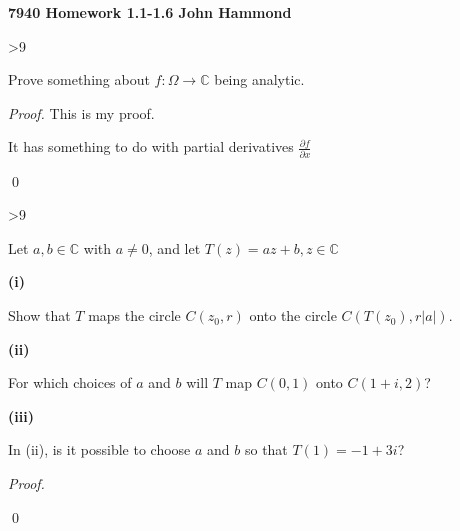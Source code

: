 \documentclass{article}
\def\C{{\mathbb{C}}}
\newcommand{\pd}[2]{\frac{\partial #1}{\partial #2}}
\newenvironment{problem}[1]%
  {\vspace{\baselineskip}%
   \ifnum #1>9 \else \hspace{.78ex} \fi {\large \bf#1.$\;$}%
   \begin{lrbox}{\probinput}%
   \begin{minipage}[t]{.9175\textwidth}}%
  {\end{minipage}%
   \end{lrbox}%
   \usebox{\probinput}}
\newenvironment{subprob}[1]%
  {\vspace{.5\baselineskip}%
   {\bf #1)$\;$}%
   \begin{lrbox}{\subinput}%
   \begin{minipage}[t]{.965\textwidth}}%
  {\end{minipage}%
   \end{lrbox}%
   \usebox{\subinput}}
\begin{document}
{\large \bf 7940 Homework 1.1-1.6 \hfill John Hammond}
\vspace{\baselineskip}

\begin{problem}{1} 
Prove something about $f : \Omega \to \C$ being analytic.

\emph{Proof.}  This is my proof.  

It has something to do with partial derivatives $\pd{f}{x}$

\qed
\end {problem}

\begin{problem}{15}
Let $a, b \in \C$ with $a \not=0$, and let $T(z) = az + b, z \in \C$

\begin{subprob}{(i}
Show that $T$ maps the circle $C(z_0, r) $ onto the circle $C(T(z_0), r|a|)$.
\end{subprob}
\begin{subprob}{(ii}
For which choices of $a$ and $b$ will $T$ map $C(0,1)$ onto $C(1 + i, 2)$?
\end{subprob}
\begin{subprob}{(iii}
In (ii), is it possible to choose $a$ and $b$ so that $T(1) = -1 + 3i$?
\end{subprob}
\emph{Proof.}

\qed
\end{problem}
\end{document}
